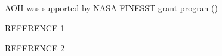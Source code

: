 \documentclass[tc, manuscript]{copernicus}
\begin{document}
\subsection{}     %


\noappendix       %




\appendixfigures  %

\appendixtables   %





\begin{acknowledgements}
AOH was supported by NASA FINESST grant progran ()
\end{acknowledgements}






\begin{thebibliography}{}

REFERENCE 1

REFERENCE 2

\end{thebibliography}

\end{document}
